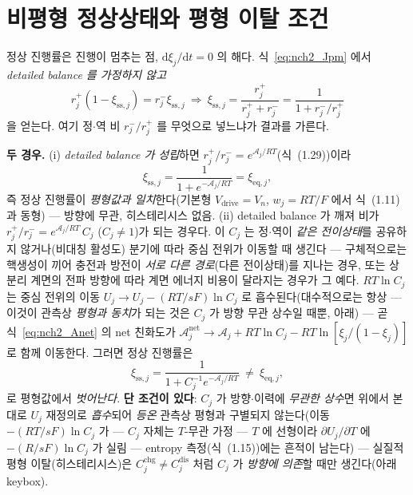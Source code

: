 \documentclass[11pt,a4paper]{article}
\newcommand{\dd}{\mathrm{d}}
\newcommand{\eq}{\mathrm{eq}}
\newcommand{\drive}{\mathrm{drive}}
\newcommand{\sstat}{\mathrm{ss}}
\begin{document}
\section{비평형 정상상태와 평형 이탈 조건}\label{sec:nch2_ss}
정상 진행률은 진행이 멈추는 점, $\dd\xi_j/\dd t=0$ 의 해다. 식~\eqref{eq:nch2_Jpm} 에서 \emph{detailed balance 를
가정하지 않고}
\begin{equation}
r_j^+(1-\xi_{\sstat,j})=r_j^-\xi_{\sstat,j}\ \Longrightarrow\
\xi_{\sstat,j}=\frac{r_j^+}{r_j^++r_j^-}=\frac{1}{1+r_j^-/r_j^+}
\label{eq:nch2_xiss}
\end{equation}
을 얻는다. 여기 정$\cdot$역 비 $r_j^-/r_j^+$ 를 무엇으로 넣느냐가 결과를 가른다.

\textbf{두 경우.} (i) \emph{detailed balance 가 성립}하면 $r_j^+/r_j^-=e^{\mathcal A_j/RT}$(식~(1.29))이라
\begin{equation}
\xi_{\sstat,j}=\frac{1}{1+e^{-\mathcal A_j/RT}}=\xi_{\eq,j},
\label{eq:nch2_ss_eq}
\end{equation}
즉 정상 진행률이 \emph{평형값과 일치}한다(기본형 $V_\drive=V_n$, $w_j=RT/F$ 에서 식~(1.11)과 동형) — 방향에 무관,
히스테리시스 없음. (ii) detailed balance 가 깨져 비가 $r_j^+/r_j^-=e^{\mathcal A_j/RT}\,C_j$ ($C_j\ne1$)가 되는
경우다. 이 $C_j$ 는 정$\cdot$역이 \emph{같은 전이상태}를 공유하지 않거나(비대칭 활성도) 분기에 따라 중심 전위가 이동할 때
생긴다 — 구체적으로는 핵생성이 끼어 충전과 방전이 \emph{서로 다른 경로}(다른 전이상태)를 지나는 경우, 또는 상분리
계면의 전파 방향에 따라 계면 에너지 비용이 달라지는 경우가 그 예다. $RT\ln C_j$ 는 중심 전위의 이동 $U_j\to U_j-(RT/sF)\ln C_j$ 로 흡수된다(대수적으로는 항상 — 이것이 관측상
\emph{평형과 동치}가 되는 것은 $C_j$ 가 방향 무관 상수일 때뿐, 아래) — 곧 식~\eqref{eq:nch2_Anet}
의 net 친화도가 $\mathcal A_j^{\mathrm{net}}\to\mathcal A_j+RT\ln C_j-RT\ln[\xi_j/(1-\xi_j)]$ 로 함께 이동한다.
그러면 정상 진행률은
\begin{equation}
\xi_{\sstat,j}=\frac{1}{1+C_j^{-1}e^{-\mathcal A_j/RT}}\ \ne\ \xi_{\eq,j},
\label{eq:nch2_ss_neq}
\end{equation}
로 평형값에서 \emph{벗어난다}. \textbf{단 조건이 있다}: $C_j$ 가 방향$\cdot$이력에 \emph{무관한 상수}면 위에서 본
대로 $U_j$ 재정의로 \emph{흡수}되어 \emph{등온} 관측상 평형과 구별되지 않는다(이동 $-(RT/sF)\ln C_j$ 가 — $C_j$ 자체는 $T$-무관 가정 — $T$ 에
선형이라 $\partial U_j/\partial T$ 에 $-(R/sF)\ln C_j$ 가 실림 — entropy 측정(식~(1.15))에는 흔적이 남는다) — 실질적 평형 이탈(히스테리시스)은
$C_j^{\mathrm{chg}}\ne C_j^{\mathrm{dis}}$ 처럼 $C_j$ 가 \emph{방향에 의존}할 때만 생긴다(아래 keybox).
\end{document}
